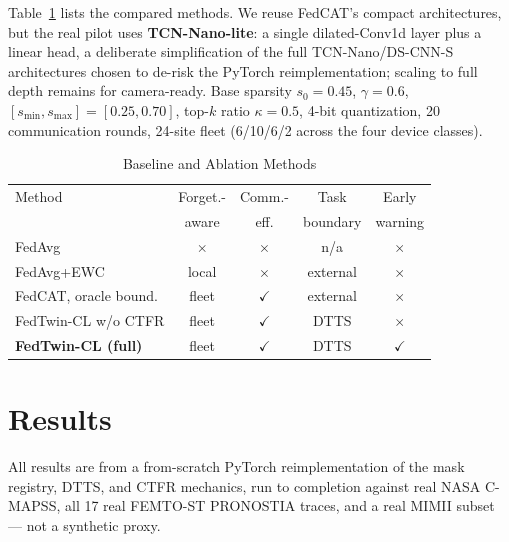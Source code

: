 \documentclass[journal]{IEEEtran}
\newcommand{\cmark}{\ensuremath{\checkmark}}
\newcommand{\xmark}{\ensuremath{\times}}
\begin{document}
Table~\ref{tab:methods} lists the compared methods. We reuse FedCAT's compact architectures, but the real pilot uses \textbf{TCN-Nano-lite}: a single dilated-Conv1d layer plus a linear head, a deliberate simplification of the full TCN-Nano/DS-CNN-S architectures chosen to de-risk the PyTorch reimplementation; scaling to full depth remains for camera-ready. Base sparsity $s_0=0.45$, $\gamma=0.6$, $[s_{\min},s_{\max}]=[0.25,0.70]$, top-$k$ ratio $\kappa=0.5$, 4-bit quantization, 20 communication rounds, 24-site fleet (6/10/6/2 across the four device classes).

\begin{table}[H]
\centering
\caption{Baseline and Ablation Methods}
\label{tab:methods}
\small
\begin{tabular}{@{}lcccc@{}}
\toprule
Method & Forget.- & Comm.- & Task & Early \\
& aware & eff. & boundary & warning \\
\midrule
FedAvg \cite{mcmahan2017fedavg} & \xmark & \xmark & n/a & \xmark \\
FedAvg+EWC \cite{kirkpatrick2017ewc} & local & \xmark & external & \xmark \\
FedCAT, oracle bound. & fleet & \cmark & external & \xmark \\
FedTwin-CL w/o CTFR & fleet & \cmark & DTTS & \xmark \\
\textbf{FedTwin-CL (full)} & fleet & \cmark & DTTS & \cmark \\
\bottomrule
\end{tabular}
\end{table}

\section{Results}

All results are from a from-scratch PyTorch reimplementation of the mask registry, DTTS, and CTFR mechanics, run to completion against real NASA C-MAPSS, all 17 real FEMTO-ST PRONOSTIA traces, and a real MIMII subset — not a synthetic proxy.
\end{document}
